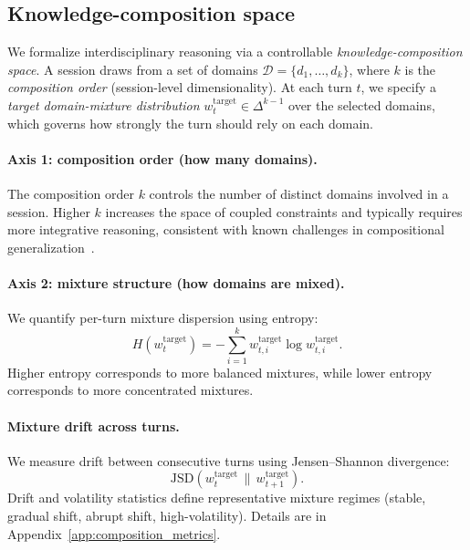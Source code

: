 
\subsection{Knowledge-composition space}
\label{sec:composition_space}

We formalize interdisciplinary reasoning via a controllable \emph{knowledge-composition space}.
A session draws from a set of domains $\mathcal{D}=\{d_1,\ldots,d_k\}$, where $k$ is the \emph{composition order} (session-level dimensionality).
At each turn $t$, we specify a \emph{target domain-mixture distribution} $w_t^{\text{target}} \in \Delta^{k-1}$ over the selected domains, which governs how strongly the turn should rely on each domain.

\paragraph{Axis 1: composition order (how many domains).}
The composition order $k$ controls the number of distinct domains involved in a session.
Higher $k$ increases the space of coupled constraints and typically requires more integrative reasoning, consistent with known challenges in compositional generalization~\citep{lake2018generalization,keysers2020measuring}.

\paragraph{Axis 2: mixture structure (how domains are mixed).}
We quantify per-turn mixture dispersion using entropy:
\begin{equation}
H(w_t^{\text{target}}) = -\sum_{i=1}^{k} w^{\text{target}}_{t,i}\log w^{\text{target}}_{t,i}.
\end{equation}
Higher entropy corresponds to more balanced mixtures, while lower entropy corresponds to more concentrated mixtures.

\paragraph{Mixture drift across turns.}
We measure drift between consecutive turns using Jensen--Shannon divergence:
\begin{equation}
\mathrm{JSD}(w_t^{\text{target}} \,\|\, w_{t+1}^{\text{target}}).
\end{equation}
Drift and volatility statistics define representative mixture regimes (stable, gradual shift, abrupt shift, high-volatility).
Details are in Appendix~\ref{app:composition_metrics}.

